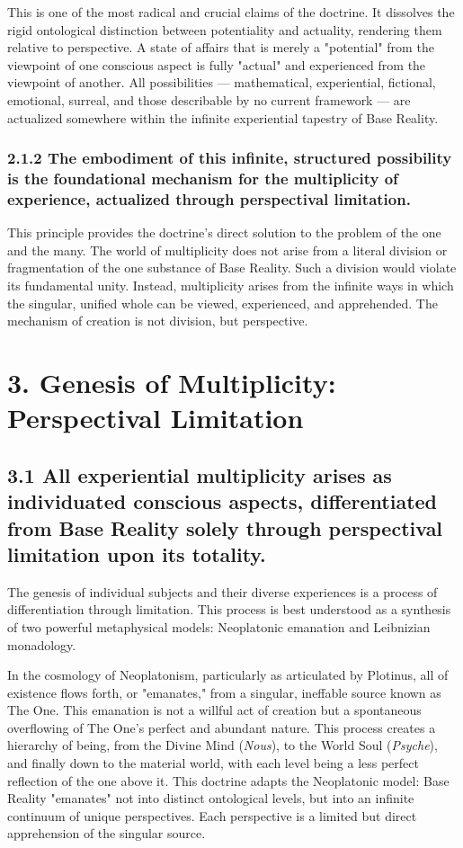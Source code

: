 This is one of the most radical and crucial claims of the doctrine. It dissolves the rigid ontological distinction between potentiality and actuality, rendering them relative to perspective. A state of affairs that is merely a "potential" from the viewpoint of one conscious aspect is fully "actual" and experienced from the viewpoint of another. All possibilities — mathematical, experiential, fictional, emotional, surreal, and those describable by no current framework — are actualized somewhere within the infinite experiential tapestry of Base Reality.


\subsubsection*{2.1.2 The embodiment of this infinite, structured possibility is the foundational mechanism for the multiplicity of experience, actualized through perspectival limitation.}


This principle provides the doctrine's direct solution to the problem of the one and the many. The world of multiplicity does not arise from a literal division or fragmentation of the one substance of Base Reality. Such a division would violate its fundamental unity. Instead, multiplicity arises from the infinite ways in which the singular, unified whole can be viewed, experienced, and apprehended. The mechanism of creation is not division, but perspective.


\bigskip\noindent\makebox[\textwidth]{\color{rulegray}\rule{5cm}{0.3pt}}\bigskip


\section*{3. Genesis of Multiplicity: Perspectival Limitation}


\subsection*{3.1 All experiential multiplicity arises as individuated conscious aspects, differentiated from Base Reality solely through perspectival limitation upon its totality.}


The genesis of individual subjects and their diverse experiences is a process of differentiation through limitation. This process is best understood as a synthesis of two powerful metaphysical models: Neoplatonic emanation and Leibnizian monadology.


In the cosmology of Neoplatonism, particularly as articulated by Plotinus, all of existence flows forth, or "emanates," from a singular, ineffable source known as The One. This emanation is not a willful act of creation but a spontaneous overflowing of The One's perfect and abundant nature. This process creates a hierarchy of being, from the Divine Mind (\textit{Nous}), to the World Soul (\textit{Psyche}), and finally down to the material world, with each level being a less perfect reflection of the one above it. This doctrine adapts the Neoplatonic model: Base Reality "emanates" not into distinct ontological levels, but into an infinite continuum of unique perspectives. Each perspective is a limited but direct apprehension of the singular source.


